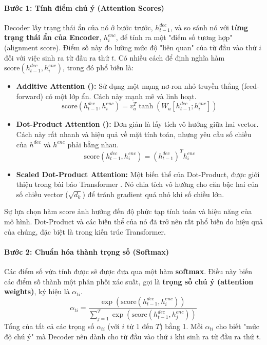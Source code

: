 \paragraph{Bước 1: Tính điểm chú ý (Attention Scores)}
Decoder lấy trạng thái ẩn của nó ở bước trước, $h_{t-1}^{dec}$, và so sánh nó với \textbf{từng trạng thái ẩn của Encoder}, $h_i^{enc}$, để tính ra một "điểm số tương hợp" (alignment score). Điểm số này đo lường mức độ "liên quan" của từ đầu vào thứ $i$ đối với việc sinh ra từ đầu ra thứ $t$. Có nhiều cách để định nghĩa hàm $\text{score}(h_{t-1}^{dec}, h_i^{enc})$, trong đó phổ biến là:
\begin{itemize}
    \item \textbf{Additive Attention (\cite{bahdanau2014neural}):} Sử dụng một mạng nơ-ron nhỏ truyền thẳng (feed-forward) có một lớp ẩn. Cách này mạnh mẽ và linh hoạt.
        $$ \text{score}(h_{t-1}^{dec}, h_i^{enc}) = v_a^T \tanh(W_a [h_{t-1}^{dec}; h_i^{enc}]) $$
    \item \textbf{Dot-Product Attention (\cite{luong2015effective}):} Đơn giản là lấy tích vô hướng giữa hai vector. Cách này rất nhanh và hiệu quả về mặt tính toán, nhưng yêu cầu số chiều của $h^{dec}$ và $h^{enc}$ phải bằng nhau.
        $$ \text{score}(h_{t-1}^{dec}, h_i^{enc}) = (h_{t-1}^{dec})^T h_i^{enc} $$
    \item \textbf{Scaled Dot-Product Attention:} Một biến thể của Dot-Product, được giới thiệu trong bài báo Transformer \cite{vaswani2017attention}. Nó chia tích vô hướng cho căn bậc hai của số chiều vector ($\sqrt{d_k}$) để tránh gradient quá nhỏ khi số chiều lớn.
\end{itemize}
Sự lựa chọn hàm score ảnh hưởng đến độ phức tạp tính toán và hiệu năng của mô hình. Dot-Product và các biến thể của nó đã trở nên rất phổ biến do hiệu quả của chúng, đặc biệt là trong kiến trúc Transformer.
\paragraph{Bước 2: Chuẩn hóa thành trọng số (Softmax)}
Các điểm số vừa tính được sẽ được đưa qua một hàm \textbf{softmax}. Điều này biến các điểm số thành một phân phối xác suất, gọi là \textbf{trọng số chú ý (attention weights)}, ký hiệu là $\alpha_{ti}$.
$$ \alpha_{ti} = \frac{\exp(\text{score}(h_{t-1}^{dec}, h_i^{enc}))}{\sum_{j=1}^{T} \exp(\text{score}(h_{t-1}^{dec}, h_j^{enc}))} $$
Tổng của tất cả các trọng số $\alpha_{ti}$ (với $i$ từ 1 đến $T$) bằng 1. Mỗi $\alpha_{ti}$ cho biết "mức độ chú ý" mà Decoder nên dành cho từ đầu vào thứ $i$ khi sinh ra từ đầu ra thứ $t$.

